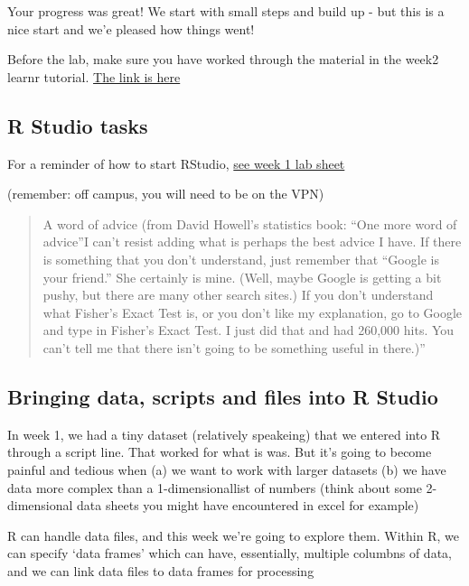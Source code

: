 \documentclass[
]{book}
\begin{document}
Your progress was great! We start with small steps and build up - but this is a nice start and we'e pleased how things went!

Before the lab, make sure you have worked through the material in the week2 learnr tutorial.
\href{https://ma-rconnect.lancs.ac.uk/W2LabPrep/}{The link is here}

\hypertarget{r-studio-tasks}{%
\subsection{R Studio tasks}\label{r-studio-tasks}}

For a reminder of how to start RStudio,
\href{https://tombeesley.github.io/PSYC121_2022-23/\#task-3---using-rstudio}{see week 1 lab sheet}

(remember: off campus, you will need to be on the VPN)

\begin{quote}
A word of advice (from David Howell's statistics book: ``One more word of advice''I can't resist adding what is perhaps the best advice I have. If there is something that you don't understand, just remember that ``Google is your friend.'' She certainly is mine. (Well, maybe Google is getting a bit pushy, but there are many other search sites.) If you don't understand what Fisher's Exact Test is, or you don't like my explanation, go to Google and type in Fisher's Exact Test. I just did that and had 260,000 hits. You can't tell me that there isn't going to be something useful in there.)''
\end{quote}

\hypertarget{bringing-data-scripts-and-files-into-r-studio}{%
\subsection{Bringing data, scripts and files into R Studio}\label{bringing-data-scripts-and-files-into-r-studio}}

In week 1, we had a tiny dataset (relatively speakeing) that we entered into R through a script line.
That worked for what is was. But it's going to become painful and tedious when (a) we want to work with larger datasets (b) we have data more complex than a 1-dimensionallist of numbers (think about some 2-dimensional data sheets you might have encountered in excel for example)

R can handle data files, and this week we're going to explore them. Within R, we can specify `data frames' which can have, essentially, multiple columbns of data, and we can link data files to data frames for processing
\end{document}
